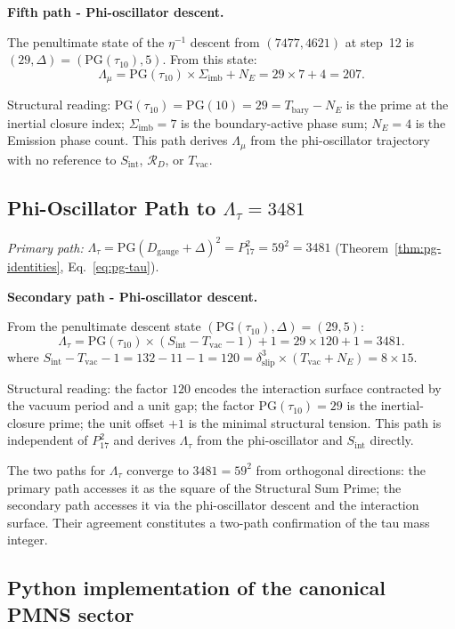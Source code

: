 \documentclass[11pt, letterpaper]{article}
\newcommand{\aop}{\eta}
\newcommand{\Tbary}{T_{\mathrm{bary}}}
\newcommand{\Dg}{D_{\mathrm{gauge}}}
\newcommand{\Sint}{S_{\mathrm{int}}}
\newcommand{\Sigimb}{\Sigma_{\mathrm{imb}}}
\newcommand{\PG}{\mathrm{PG}}
\theoremstyle{definition}
\theoremstyle{plain}
\begin{document}
\medskip
\noindent\textbf{Fifth path - Phi-oscillator descent.}

\begin{rsbox}
The penultimate state of the $\aop^{-1}$ descent from $(7477,4621)$ at
step~12 is $(29,\Delta)=(\PG(\tau_{10}),5)$.  From this state:
\[
\Lambda_\mu = \PG(\tau_{10})\times\Sigimb+N_E = 29\times 7+4 = 207.
\]
\end{rsbox}

Structural reading: $\PG(\tau_{10})=\PG(10)=29=\Tbary-N_E$ is the prime at
the inertial closure index; $\Sigimb=7$ is the boundary-active phase sum;
$N_E=4$ is the Emission phase count.  This path derives $\Lambda_\mu$ from
the phi-oscillator trajectory with no reference to $\Sint$, $\mathcal{R}_D$,
or $T_{\mathrm{vac}}$.

\subsection{Phi-Oscillator Path to $\Lambda_\tau=3481$}\label{app:ltau-phiosc}

\noindent\textit{Primary path:}
$\Lambda_\tau=\PG(\Dg+\Delta)^2=P_{17}^2=59^2=3481$
(Theorem~\ref{thm:pg-identities}, Eq.~\eqref{eq:pg-tau}).

\medskip
\noindent\textbf{Secondary path - Phi-oscillator descent.}

\begin{rsbox}
From the penultimate descent state
$(\PG(\tau_{10}),\Delta)=(29,5)$:
\[
\Lambda_\tau
= \PG(\tau_{10})\times(\Sint-T_{\mathrm{vac}}-1)+1
= 29\times 120+1
= 3481.
\]
where $\Sint-T_{\mathrm{vac}}-1=132-11-1=120=\delta_{\mathrm{slip}}^3
\times(T_{\mathrm{vac}}+N_E)=8\times 15$.
\end{rsbox}

Structural reading: the factor $120$ encodes the interaction surface
contracted by the vacuum period and a unit gap; the factor
$\PG(\tau_{10})=29$ is the inertial-closure prime; the unit offset $+1$
is the minimal structural tension.  This path is independent of $P_{17}^2$
and derives $\Lambda_\tau$ from the phi-oscillator and $\Sint$ directly.

\bigskip\noindent The two paths for $\Lambda_\tau$ converge to $3481=59^2$
from orthogonal directions: the primary path accesses it as the square of the
Structural Sum Prime; the secondary path accesses it via the phi-oscillator
descent and the interaction surface.  Their agreement constitutes a two-path
confirmation of the tau mass integer.


\subsection{Python implementation of the canonical PMNS sector}
\label{app:pmns-python}
\end{document}
